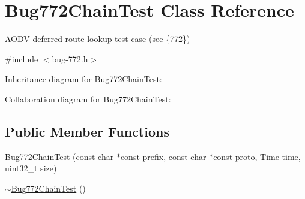 \hypertarget{classBug772ChainTest}{}\section{Bug772\+Chain\+Test Class Reference}
\label{classBug772ChainTest}


A\+O\+DV deferred route lookup test case (see \{772\})  




{\ttfamily \#include $<$bug-\/772.\+h$>$}



Inheritance diagram for Bug772\+Chain\+Test\+:


Collaboration diagram for Bug772\+Chain\+Test\+:
\subsection*{Public Member Functions}
\begin{DoxyCompactItemize}
\item 
\hyperlink{classBug772ChainTest_a140d0870edac38189152a782f5255dd1}{Bug772\+Chain\+Test} (const char $\ast$const prefix, const char $\ast$const proto, \hyperlink{classns3_1_1Time}{Time} time, uint32\+\_\+t size)
\item 
\hyperlink{classBug772ChainTest_ad965916b1933d847e4ed4f37a0967823}{$\sim$\+Bug772\+Chain\+Test} ()
\end{DoxyCompactItemize}

